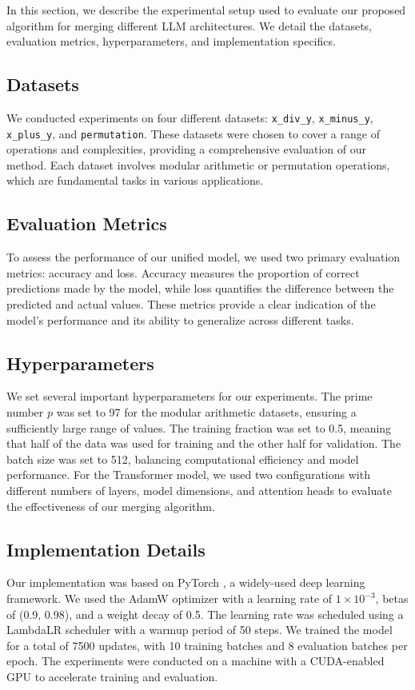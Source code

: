 \documentclass{article} %
\begin{document}
In this section, we describe the experimental setup used to evaluate our proposed algorithm for merging different LLM architectures. We detail the datasets, evaluation metrics, hyperparameters, and implementation specifics.

\subsection{Datasets}
We conducted experiments on four different datasets: \texttt{x\_div\_y}, \texttt{x\_minus\_y}, \texttt{x\_plus\_y}, and \texttt{permutation}. These datasets were chosen to cover a range of operations and complexities, providing a comprehensive evaluation of our method. Each dataset involves modular arithmetic or permutation operations, which are fundamental tasks in various applications.

\subsection{Evaluation Metrics}
To assess the performance of our unified model, we used two primary evaluation metrics: accuracy and loss. Accuracy measures the proportion of correct predictions made by the model, while loss quantifies the difference between the predicted and actual values. These metrics provide a clear indication of the model's performance and its ability to generalize across different tasks.

\subsection{Hyperparameters}
We set several important hyperparameters for our experiments. The prime number \( p \) was set to 97 for the modular arithmetic datasets, ensuring a sufficiently large range of values. The training fraction was set to 0.5, meaning that half of the data was used for training and the other half for validation. The batch size was set to 512, balancing computational efficiency and model performance. For the Transformer model, we used two configurations with different numbers of layers, model dimensions, and attention heads to evaluate the effectiveness of our merging algorithm.

\subsection{Implementation Details}
Our implementation was based on PyTorch \citep{paszke2019pytorch}, a widely-used deep learning framework. We used the AdamW optimizer \citep{loshchilov2017decoupled} with a learning rate of \( 1 \times 10^{-3} \), betas of (0.9, 0.98), and a weight decay of 0.5. The learning rate was scheduled using a LambdaLR scheduler with a warmup period of 50 steps. We trained the model for a total of 7500 updates, with 10 training batches and 8 evaluation batches per epoch. The experiments were conducted on a machine with a CUDA-enabled GPU to accelerate training and evaluation.
\end{document}
